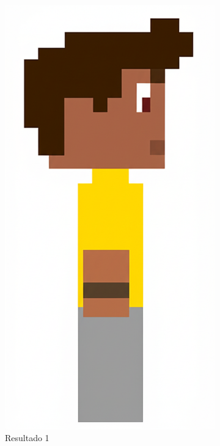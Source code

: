\begin{figure}[htbp]
\begin{subfigure}{0.23\linewidth}
        \includegraphics[width=1\linewidth]{figs/geminiPro/chat2/res1_tela3.png}
        \caption{\small Resultado 1}
        \label{fig:geminiPro6a}
    \end{subfigure}
    \begin{subfigure}{0.23\linewidth}

\end{subfigure}
\end{figure}
